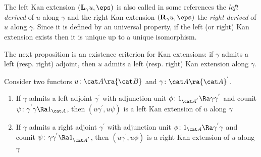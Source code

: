 The left Kan extension $({\bf L}_\gamma u, \eps)$ is also called in some references the {\it left derived} of $u$ along $\gamma$ and the right Kan extension $({\bf R}_\gamma u, \eps)$ the {\it right derived} of $u$ along $\gamma$. Since it is defined by an universal property, if the left (or right) Kan extension exists then it is unique up to a unique isomorphism. 

The next proposition is an existence criterion for Kan extensions: if $\gamma$ admits a left (resp. right) adjoint, then $u$ admits a left (resp. right) Kan extension along $\gamma$.

\begin{prop}
\label{prop:existencekanextension}
Consider two functors $u \colon {\cat A} \ra {\cat B}$ and $\gamma \colon {\cat A} \ra {\cat A}^{'}$.
\begin{enumerate}
\item
If $\gamma$ admits a left adjoint $\gamma^{'}$ with adjunction unit $\phi \colon 1_{{\cat A}^{'}} \Ra \gamma\gamma^{'}$ and counit $\psi \colon \gamma^{'}\gamma \Ra 1_{{\cat A}}$, then $(u\gamma^{'}, u \psi)$ is a left Kan extension of $u$ along $\gamma$
\item
If $\gamma$ admits a right adjoint $\gamma^{'}$ with adjunction unit $\phi \colon 1_{\cat A} \Ra \gamma^{'}\gamma$ and counit $\psi \colon \gamma\gamma^{'} \Ra 1_{{\cat A}^{'}}$, then $(u\gamma^{'}, u \phi)$ is a right Kan extension of $u$ along $\gamma$
\end{enumerate}
\end{prop}

